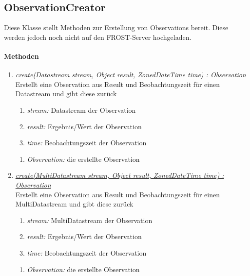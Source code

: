 
\subsection{ObservationCreator}

Diese Klasse stellt Methoden zur Erstellung von Observations bereit.
Diese werden jedoch noch nicht auf den FROST-Server hochgeladen.

\paragraph{Methoden}

\begin{enumerate}[+]
\item \underline{\textit{create(Datastream stream, Object result, ZonedDateTime time) : Observation}}\\
Erstellt eine Observation aus Result und Beobachtungszeit für einen Datastream und gibt diese zurück

\begin{enumerate}[$\bullet$]
\item \textit{stream:} Datastream der Observation
\item \textit{result:} Ergebnis/Wert der Observation
\item \textit{time:} Beobachtungszeit der Observation
\end{enumerate}
\vspace{-0.2cm}
\begin{enumerate}[$\circ$]
\item \textit{Observation:} die erstellte Observation
\end{enumerate}

\item \underline{\textit{create(MultiDatastream stream, Object result, ZonedDateTime time) : Observation}}\\
Erstellt eine Observation aus Result und Beobachtungszeit für einen MultiDatastream und gibt diese zurück

\begin{enumerate}[$\bullet$]
\item \textit{stream:} MultiDatastream der Observation
\item \textit{result:} Ergebnis/Wert der Observation
\item \textit{time:} Beobachtungszeit der Observation
\end{enumerate}
\vspace{-0.2cm}
\begin{enumerate}[$\circ$]
\item \textit{Observation:} die erstellte Observation
\end{enumerate}


\end{enumerate}
